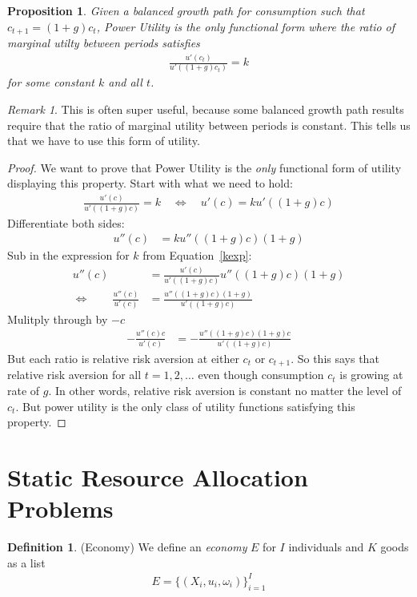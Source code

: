 \documentclass[12pt]{article}
\theoremstyle{plain}
\newtheorem{prop}[thm]{Proposition}
\theoremstyle{definition}
\newtheorem{defn}[thm]{Definition}
\theoremstyle{remark}
\newtheorem*{rmk}{Remark}
\begin{document}
\begin{prop}
Given a balanced growth path for consumption such that
$c_{t+1} = (1+g) c_{t}$,
Power Utility is the only functional form where the ratio of marginal
utilty between periods satisfies
\begin{align*}
  \frac{u'(c_t)}{u'((1+g)c_t)} = k
\end{align*}
for some constant $k$ and all $t$.
\end{prop}
\begin{rmk}
This is often super useful, because some balanced growth path results
require that the ratio of marginal utility between periods is constant.
This tells us that we have to use this form of utility.
\end{rmk}
\begin{proof}
We want to prove that Power Utility is the \emph{only} functional form
of utility displaying this property. Start with what we need to hold:
\begin{align}
  \frac{u'(c)}{u'((1+g)c)} = k
  \quad\iff\quad
  u'(c) = ku'((1+g)c)
  \label{kexp}
\end{align}
Differentiate both sides:
\begin{align*}
  u''(c) &= ku''((1+g)c)(1+g)
\end{align*}
Sub in the expression for $k$ from Equation~\ref{kexp}:
\begin{align*}
  u''(c) &=
  \frac{u'(c)}{u'((1+g)c)} u''((1+g)c)(1+g) \\
  \iff \qquad
  \frac{u''(c)}{u'(c)} &=
  \frac{u''((1+g)c)(1+g)}{u'((1+g)c)}
\end{align*}
Mulitply through by $-c$
\begin{align*}
  -\frac{u''(c)c}{u'(c)} &=
  -\frac{u''((1+g)c)(1+g)c}{u'((1+g)c)}
\end{align*}
But each ratio is relative risk aversion at either $c_t$ or $c_{t+1}$.
So this says that relative risk aversion for all $t=1,2,\ldots$ even
though consumption $c_t$ is growing at rate of $g$. In other words,
relative risk aversion is constant no matter the level of $c_t$. But
power utility is the only class of utility functions satisfying this
property.
\end{proof}



\section{Static Resource Allocation Problems}

\begin{defn}{(Economy)}
We define an \emph{economy} $E$ for $I$ individuals and $K$ goods as a
list
\begin{align*}
  E = \{(X_i,u_i,\omega_i)\}^I_{i=1}
\end{align*}
\end{defn}
\end{document}
